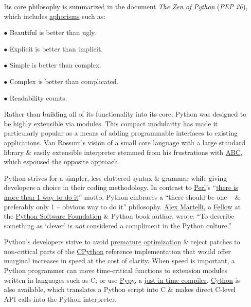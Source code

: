 \documentclass{article}
\numberwithin{equation}{section}
\begin{document}
Its core philosophy is summarized in the document \textit{The \href{https://en.wikipedia.org/wiki/Zen_of_Python}{Zen of Python}} (\textit{PEP 20}), which includes \href{https://en.wikipedia.org/wiki/Aphorism}{aphorisms} such as:
\begin{enumerate*}
	\item[$\bullet$] Beautiful is better than ugly.
	\item[$\bullet$] Explicit is better than implicit.
	\item[$\bullet$] Simple is better than complex.
	\item[$\bullet$] Complex is better than complicated.
	\item[$\bullet$] Readability counts.
\end{enumerate*}

Rather than building all of its functionality into its core, Python was designed to be highly \href{https://en.wikipedia.org/wiki/Extensibility}{extensible} via modules. This compact modularity has made it particularly popular as a means of adding programmable interfaces to existing applications. Van Rossum's vision of a small core language with a large standard library \& easily extensible interpreter stemmed from his frustrations with \href{https://en.wikipedia.org/wiki/ABC_(programming_language)}{ABC}, which espoused the opposite approach.

Python strives for a simpler, less-cluttered syntax \& grammar while giving developers a choice in their coding methodology. In contrast to \href{https://en.wikipedia.org/wiki/Perl}{Perl}'s ``\href{https://en.wikipedia.org/wiki/There_is_more_than_one_way_to_do_it}{there is more than 1 way to do it}'' motto, Python embraces a ``there should be one -- \& preferably only 1 -- obvious way to do it'' philosophy. \href{https://en.wikipedia.org/wiki/Alex_Martelli}{Alex Martelli}, a \href{https://en.wikipedia.org/wiki/Fellow}{Fellow} at the \href{https://en.wikipedia.org/wiki/Python_Software_Foundation}{Python Software Foundation} \& Python book author, wrote: ``To describe something as `clever' is \textit{not} considered a compliment in the Python culture.''

Python's developers strive to avoid \href{https://en.wikipedia.org/wiki/Premature_optimization}{premature optimization} \& reject patches to non-critical parts of the \href{https://en.wikipedia.org/wiki/CPython}{CPython} reference implementation that would offer marginal increases in speed at the cost of clarity. When speed is important, a Python programmer can move time-critical functions to extension modules written in languages such as C; or use \href{https://en.wikipedia.org/wiki/PyPy}{Pypy}, a \href{https://en.wikipedia.org/wiki/Just-in-time_compilation}{just-in-time compiler}. \href{https://en.wikipedia.org/wiki/Cython}{Cython} is also available, which translates a Python script into C \& makes direct C-level API calls into the Python interpreter.
\end{document}
